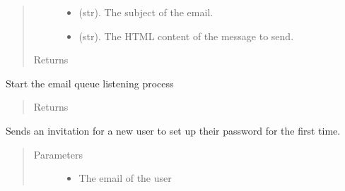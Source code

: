 \documentclass[letterpaper,10pt,english]{sphinxmanual}
\begin{document}
\begin{fulllineitems}
\begin{fulllineitems}
\begin{quote}
\begin{description}
\begin{itemize}
\item {} 
 \textendash{} (str). The subject of the email.

\item {} 
 \textendash{} (str). The HTML content of the message to send.

\end{itemize}

\item[{Returns}] \leavevmode


\end{description}\end{quote}

\end{fulllineitems}


\begin{fulllineitems}
\label{\detokenize{apidoc/utdesign_procurement:utdesign_procurement.emailer.EmailHandler.start}}
Start the email queue listening process
\begin{quote}\begin{description}
\item[{Returns}] \leavevmode


\end{description}\end{quote}

\end{fulllineitems}


\begin{fulllineitems}
\label{\detokenize{apidoc/utdesign_procurement:utdesign_procurement.emailer.EmailHandler.userAdd}}
Sends an invitation for a new user to set up their password for the
first time.
\begin{quote}\begin{description}
\item[{Parameters}] \leavevmode\begin{itemize}
\item {} 
 \textendash{} The email of the user


\end{itemize}
\end{description}
\end{quote}
\end{fulllineitems}
\end{fulllineitems}
\end{document}
